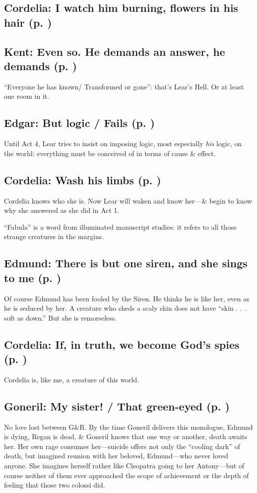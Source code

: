 \subsection{Cordelia: I watch him burning, flowers in his hair (p. \pageref{ch:lear_bg})}

\subsection{Kent: Even so. He demands an answer, he demands (p. \pageref{ch:lear_bh})}
``Everyone he has known/ Transformed or gone'': that's Lear's Hell. Or at least one room in it.

\subsection{Edgar: But logic / Fails (p. \pageref{ch:lear_bi})}
Until Act 4, Lear tries to insist on imposing logic, most especially \emph{his} logic, on the world: everything must be conceived of in terms of cause \& effect.

\subsection{Cordelia: Wash his limbs (p. \pageref{ch:lear_bj})}

Cordelia knows who she is. Now Lear will waken and know her---\& begin to know why she answered as she did in Act 1.

``Fabula'' is a word from illuminated manuscript studies: it refers to all those strange creatures in the margins.

\subsection{Edmund: There is but one siren, and she sings to me (p. \pageref{ch:lear_bk})}
Of course Edmund has been fooled by the Siren. He thinks he is like her, even as he is seduced by her. A creature who sheds a scaly skin does not have ``skin . . . soft as down.'' But she is remorseless.

\subsection{Cordelia: If, in truth, we become God's spies (p. \pageref{ch:lear_bl})}
Cordelia is, like me, a creature of this world.

\subsection{Goneril: My sister! / That green-eyed (p. \pageref{ch:lear_bm})}
No love lost between G\&R. By the time Goneril delivers this monologue, Edmund is dying, Regan is dead, \& Goneril knows that one way or another, death awaits her. Her own rage consumes her---suicide offers not only the ``cooling dark'' of death, but imagined reunion with her beloved, Edmund---who never loved anyone. She imagines herself rather like Cleopatra going to her Antony---but of course neither of them ever approached the scope of achievement or the depth of feeling that those two colossi did.

